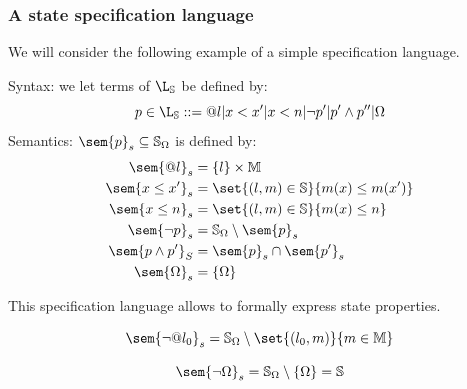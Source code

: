 \documentclass[toc]{../cs-classes/cs-classes}
\begin{document}
\subsubsection{A state specification language}
We will consider the following example of a simple specification language.
\begin{definition}
    Syntax: we let terms of $\L_{\S}$ be defined by:
    \begin{equation*}
        p\in\L_{\S} ::= @l | x<x' | x<n | \lnot p' | p'\land p'' | \Omega
    \end{equation*}
    Semantics: $\sem{p}_s\subseteq \S_\Omega$ is defined by:
    \begin{equation*}
        \begin{aligned}
            \sem{@l}_s &= \{l\} \times \mathbb{M}\\
            \sem{x\leq x'}_s &= \set{(l, m)\in\S}{m(x)\leq m(x')}\\
            \sem{x\leq n}_s &= \set{(l, m)\in\S}{m(x)\leq n}\\
            \sem{\lnot p}_s &= \S_\Omega\setminus\sem{p}_s\\
            \sem{p\land p'}_S &= \sem{p}_s \cap \sem{p'}_s\\
            \sem{\Omega}_s &= \{\Omega\}
        \end{aligned}
    \end{equation*}
\end{definition}

\noindent This specification language allows to formally express state properties. 
\begin{example}
    \begin{equation*}
        \sem{\lnot@l_0}_s = \S_\Omega \setminus \set{(l_0, m)}{m\in\mathbb{M}}
    \end{equation*}
\end{example}

\begin{example}
    \begin{equation*}
        \sem{\lnot\Omega}_s = \S_\Omega \setminus \{\Omega\} = \S
    \end{equation*}
\end{example}
\end{document}
